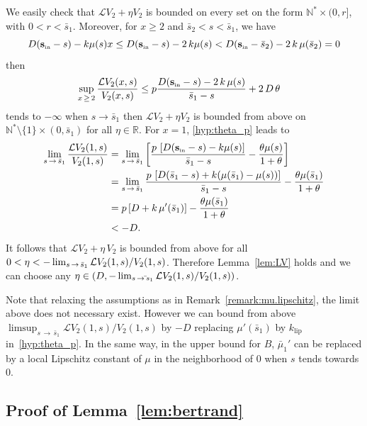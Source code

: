 \documentclass[AHL,Unicode,longabstracts,published]{cedram}
\newcommand{\RR}{\mathbb{R}}
\newcommand{\NN}{\mathbb{N}}
\newcommand{\clL}{\mathcal{L}}
\newcommand{\Sin}{{\mathbf s}_{\textrm{\tiny\rm in}}}
\newcommand{\klip}{k_{\text{lip}}}
\newcommand{\1}{\mathbf{1}}
\begin{document}
We easily check that $\clL V_2 + \eta V_2$ is bounded on every set on the form $\NN^* \times (0,r]$, with $0<r<\bar s_1$. Moreover, for $x\geq 2$ and $\bar s_2<s<\bar s_1$, we have
\[
D(\Sin - s)- k \mu(s) x \leq D(\Sin - s)- 2\,k \mu(s) < D(\Sin -\bar{s}_2)- 2\,k\,\mu(\bar{s}_2)=0
\]
then
\begin{align*}
\sup_{x\,\geq\,2}\frac{\clL V_2(x,s)}{V_2(x,s)} &\leq p \frac{D(\Sin - s)- 2\,k\,\mu(s) }{\bar{s}_1-s} + 2\,D\,\theta
\end{align*}
tends to $-\infty$ when $s\to \bar{s}_1$ then $\clL V_2 + \eta V_2$ is bounded from above on $\NN^*\setminus\{1\} \times (0,\bar s_1)$ for all $\eta\in\RR$. For $x =1$, \eqref{hyp:theta_p} leads to
\begin{align*}
\lim_{s\,\to\,\bar{s}_1} \frac{\clL V_2(1,s)}{V_2(1,s)} &= \lim_{s\,\to\,\bar{s}_1} \left[\frac{p\, \left[D(\Sin - s)- k \mu(s)\right]}{\bar{s}_1-s} - \frac{\theta \mu(s)}{1+\theta}\right]\\
&= \lim_{s\,\to\,\bar{s}_1} \frac{p\, \left[D(\bar s_1 - s)+ k (\mu(\bar s_1)-\mu(s))\right]}{\bar{s}_1-s} - \frac{\theta \mu(\bar s_1)}{1+\theta}\\
& = p\left[D+ k \,\mu'(\bar s_1)\right]- \frac{\theta \mu(\bar s_1)}{1+\theta}\\
& <-D.
\end{align*}
It follows that $\clL V_2 + \eta\,V_2$ is bounded from above for all $0<\eta<-\lim_{s \,\to\,\bar s_1} \clL V_2(1,s)/\linebreak V_2(1,s)$. Therefore Lemma~\ref{lem:LV} holds and we can choose any $\eta\in (D, -\lim_{s\,\to \bar\,s_1}\linebreak \clL V_2(1,s)/V_2(1,s))$.

Note that relaxing the assumptions as in Remark~\ref{remark:mu.lipschitz}, the limit above does not necessary exist. However we can bound from above $\limsup_{s\,\to\,\bar s_1} \clL V_2(1,s)/V_2(1,s)$ by $-D$ replacing $\mu'(\bar s_1)$ by $\klip$ in~\eqref{hyp:theta_p}. In the same way, in the upper bound for $B$, $\bar \mu_1'$ can be replaced by a local Lipschitz constant of $\mu$ in the neighborhood of 0 when $s$ tends towards 0.



\subsection{Proof of Lemma~\ref{lem:bertrand}}\label{sec:lem.bertrand}
\end{document}
